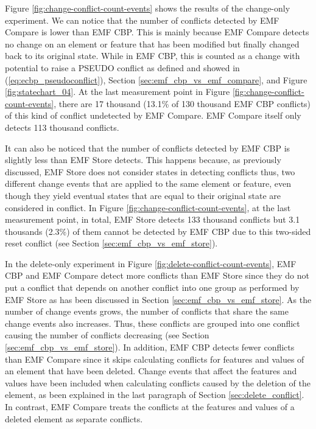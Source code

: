 Figure \ref{fig:change-conflict-count-events} shows the results of the change-only experiment. We can notice that the number of conflicts detected by EMF Compare is lower than EMF CBP. This is mainly because EMF Compare detects no change on an element or feature that has been modified but finally changed back to its original state. While in EMF CBP, this is counted as a change with potential to raise a {PSEUDO} conflict as defined and showed in (\ref{eq:ecbp_pseudoconflict}), Section \ref{sec:emf_cbp_vs_emf_compare}, and Figure \ref{fig:statechart_04}. At the last measurement point in Figure \ref{fig:change-conflict-count-events}, there are 17 thousand (13.1\% of 130 thousand EMF CBP conflicts) of this kind of conflict undetected by EMF Compare. EMF Compare itself only detects 113 thousand conflicts. 

It can also be noticed that the number of conflicts detected by EMF CBP is slightly less than EMF Store detects. This happens because, as previously discussed, EMF Store does not consider states in detecting conflicts thus, two different change events that are applied to the same element or feature, even though they yield eventual states that are equal to their original state are considered in conflict. In Figure \ref{fig:change-conflict-count-events}, at the last measurement point, in total, EMF Store detects 133 thousand conflicts but 3.1 thousands (2.3\%) of them cannot be detected by EMF CBP due to this two-sided reset conflict (see Section \ref{sec:emf_cbp_vs_emf_store}). 

In the delete-only experiment in Figure \ref{fig:delete-conflict-count-events}, EMF CBP and EMF Compare detect more conflicts than EMF Store since they do not put a conflict that depends on another conflict into one group as performed by EMF Store as has been discussed in Section \ref{sec:emf_cbp_vs_emf_store}. As the number of change events grows, the number of conflicts that share the same change events also increases. Thus, these conflicts are grouped into one conflict causing the number of conflicts decreasing (see Section \ref{sec:emf_cbp_vs_emf_store}). In addition, EMF CBP detects fewer conflicts than EMF Compare since it skips calculating conflicts for features and values of an element that have been deleted. Change events that affect the features and values have been included when calculating conflicts caused by the deletion of the element, as been explained in the last paragraph of Section \ref{sec:delete_conflict}. In contrast, EMF Compare treats the conflicts at the features and values of a deleted element as separate conflicts. 

